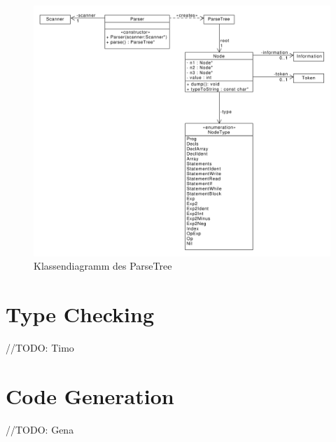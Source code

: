 \documentclass[
a4paper
]{scrreprt}
\begin{document}
		\begin{figure}[htbp]
			\centering
			\includegraphics[width=\textwidth]{./diagramms/parser.pdf}
			\caption{Klassendiagramm des ParseTree}
		\end{figure}

	
	\section{Type Checking}
		//TODO: Timo
		
    \section{Code Generation}
	    //TODO: Gena

	
\end{document}
